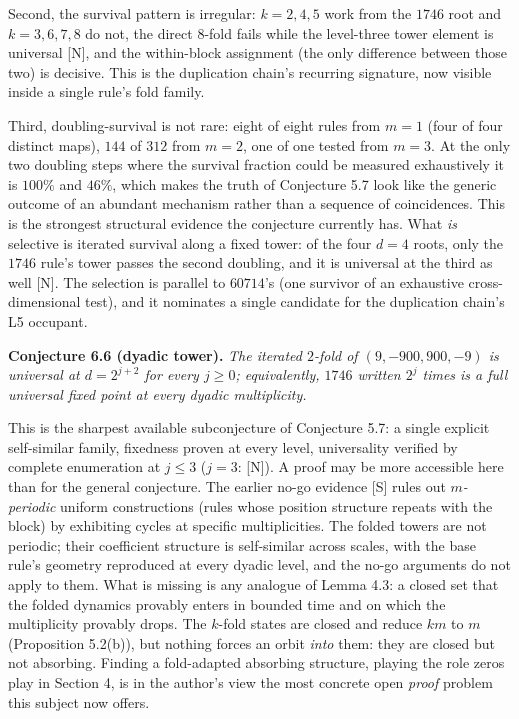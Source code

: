 \documentclass[11pt,letterpaper]{article}
\theoremstyle{paperstyle}
\theoremstyle{paperstyledef}
\theoremstyle{paperstylerem}
\begin{document}
Second, the survival pattern is irregular: \(k = 2, 4, 5\) work from the \(1746\) root and \(k = 3, 6, 7, 8\) do not, the direct \(8\)-fold fails while the level-three tower element is universal {[}N{]}, and the within-block assignment (the only difference between those two) is decisive. This is the duplication chain's recurring signature, now visible inside a single rule's fold family.

Third, doubling-survival is not rare: eight of eight rules from \(m = 1\) (four of four distinct maps), \(144\) of \(312\) from \(m = 2\), one of one tested from \(m = 3\). At the only two doubling steps where the survival fraction could be measured exhaustively it is \(100\%\) and \(46\%\), which makes the truth of Conjecture 5.7 look like the generic outcome of an abundant mechanism rather than a sequence of coincidences. This is the strongest structural evidence the conjecture currently has. What \emph{is} selective is iterated survival along a fixed tower: of the four \(d = 4\) roots, only the \(1746\) rule's tower passes the second doubling, and it is universal at the third as well {[}N{]}. The selection is parallel to \(60714\)'s (one survivor of an exhaustive cross-dimensional test), and it nominates a single candidate for the duplication chain's L5 occupant.

\textbf{Conjecture 6.6 (dyadic tower).} \emph{The iterated \(2\)-fold of \((9, -900, 900, -9)\) is universal at \(d = 2^{j+2}\) for every \(j \geq 0\); equivalently, \(1746\) written \(2^j\) times is a full universal fixed point at every dyadic multiplicity.}

This is the sharpest available subconjecture of Conjecture 5.7: a single explicit self-similar family, fixedness proven at every level, universality verified by complete enumeration at \(j \leq 3\) (\(j = 3\): {[}N{]}). A proof may be more accessible here than for the general conjecture. The earlier no-go evidence {[}S{]} rules out \emph{\(m\)-periodic} uniform constructions (rules whose position structure repeats with the block) by exhibiting cycles at specific multiplicities. The folded towers are not periodic; their coefficient structure is self-similar across scales, with the base rule's geometry reproduced at every dyadic level, and the no-go arguments do not apply to them. What is missing is any analogue of Lemma 4.3: a closed set that the folded dynamics provably enters in bounded time and on which the multiplicity provably drops. The \(k\)-fold states are closed and reduce \(km\) to \(m\) (Proposition 5.2(b)), but nothing forces an orbit \emph{into} them: they are closed but not absorbing. Finding a fold-adapted absorbing structure, playing the role zeros play in Section 4, is in the author's view the most concrete open \emph{proof} problem this subject now offers.
\end{document}
